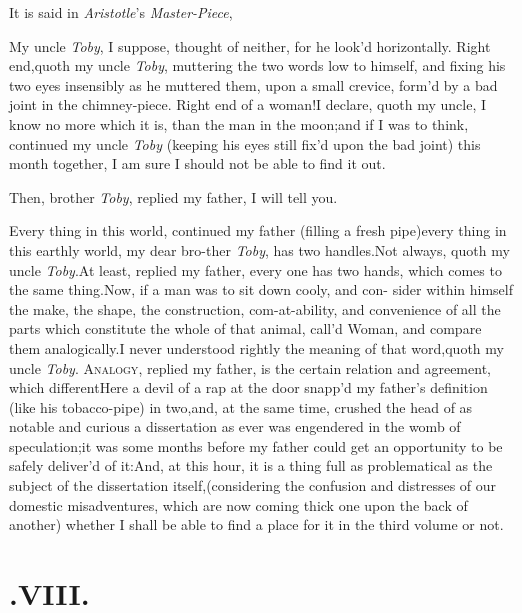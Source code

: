 \documentclass{article}
\begin{document}
It is said in \textit{Aristotle}’s \textit{Master-Piece},\break
{}

My uncle \textit{Toby}, I suppose, thought of neither, for he
look’d horizontally.\tsk\break
Right end,\tsk quoth my uncle \textit{Toby}, muttering the two words low to himself, and fixing his
two eyes insensibly as he muttered them, upon a small crevice,
form’d by a bad joint in the chimney-piece.\tsk\break
Right end of a woman!\tsh I declare,
quoth my uncle, I know no more which it is, than the man in the
moon;\tsk and if I was to think, continued my uncle
\textit{Toby} (keeping his eyes still fix’d upon the bad joint)
this month together, I am sure I should not be able to find it
out.

Then, brother \textit{Toby}, replied my father, I will tell you.

Every thing in this world, continued my father (filling a fresh
pipe)\tsk every thing in this earthly world, my dear
bro-\break ther \textit{Toby},
has two handles.\tsk Not always, quoth my uncle
\textit{Toby}.\tsh At least, replied my father, every one
has two hands,\tsk\break
which comes to the same
thing.\tsh Now, if a man was to sit down cooly, and con-\break
sider within himself the make, the shape, the construction,
com-at-ability, and convenience of all the parts which
constitute
the whole of that animal, call’d Woman, and compare them
analogically.\tsk I never understood rightly the meaning of that
word,\tsk quoth my uncle \textit{Toby}.\tsh\break
\textsc{Analogy}, replied my father, is the certain
relation and agreement, which different\tsh Here a devil of
a rap at the door snapp’d my father’s definition (like his
tobacco-pipe) in two,\tsk and, at the same time, crushed the head
of as notable and curious a dissertation as ever was
engendered in the womb of speculation;\tsk it was some months
before my father could get an opportunity to be safely
deliver’d of
it:\tsk And, at this hour, it is a thing full as problematical as
the subject of the dissertation itself,\tsk (considering the
confusion and distresses of our domestic misadventures, which are
now coming thick one upon the back of another) whether I shall be
able to find a place for it in the third volume or not.

\null
\section{.\enspace  VIII.}
\end{document}

